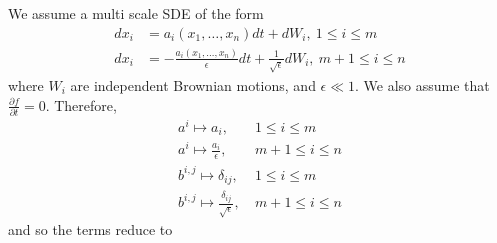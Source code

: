 \documentclass[12pt]{article}
\begin{document}
We assume a multi scale SDE of the form
\begin{equation} \label{eq:general_SDE}
\begin{aligned}
dx_i &= a_i(x_1, \dots, x_n) dt + dW_i, \: 1 \le i \le m \\
dx_i &= -\frac{a_i(x_1, \dots, x_n)}{\epsilon} dt + \frac{1}{\sqrt{\epsilon}} dW_i , \: m+1 \le i \le n
\end{aligned}
\end{equation}
where $W_i$ are independent Brownian motions, and $\epsilon \ll 1$.
%
We also assume that $\frac{\partial f}{\partial t} = 0$. 
%
Therefore,
\begin{equation}
\begin{aligned}
a^i \mapsto a_i, \: & 1 \le i \le m \\
a^i \mapsto \frac{a_i}{\epsilon}, \: & m+1 \le i \le n \\
b^{i,j} \mapsto \delta_{ij}, \: & 1 \le i \le m \\
b^{i,j} \mapsto \frac{\delta_{ij}}{\sqrt{\epsilon}}, \: & m+1 \le i \le n 
\end{aligned}
\end{equation}
%
and so the terms reduce to
%
\end{document}
